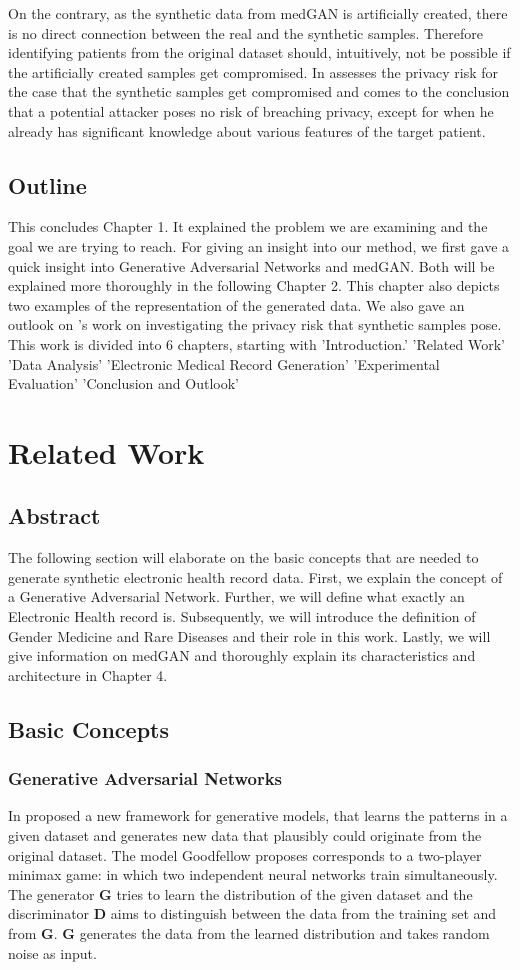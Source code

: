 \documentclass[11pt, a4paper]{book}
\begin{document}
On the contrary, as the synthetic data from medGAN is artificially created, there is no direct connection between the real and the synthetic samples. Therefore identifying patients from the original dataset should, intuitively, not be possible if the artificially created samples get compromised. In \cite{Choi2017} assesses the privacy risk for the case that the synthetic samples get compromised and comes to the conclusion that a potential attacker poses no risk of breaching privacy, except for when he already has significant knowledge about various features of the target patient.
\section{Outline}
This concludes Chapter 1. It explained the problem we are examining and the goal we are trying to reach.
For giving an insight into our method, we first gave a quick insight into Generative Adversarial Networks and medGAN. Both will be explained more thoroughly in the following Chapter 2. This chapter also depicts two examples of the representation of the generated data. We also gave an outlook on \cite{Choi2017}'s work on investigating the privacy risk that synthetic samples pose.
This work is divided into 6 chapters, starting with 'Introduction.'
'Related Work'
'Data Analysis'
'Electronic Medical Record Generation'
'Experimental Evaluation'
'Conclusion and Outlook'
\chapter{Related Work}
\section{Abstract}
The following section will elaborate on the basic concepts that are needed to  generate synthetic electronic health record data.
First, we explain the concept of a Generative Adversarial Network. Further, we will define what exactly an Electronic Health record is. Subsequently, we will introduce the definition of Gender Medicine and Rare Diseases and their role in this work. Lastly, we will give information on medGAN and thoroughly explain its characteristics and architecture in Chapter 4.

\section{Basic Concepts}
\subsection{Generative Adversarial Networks}
In \cite{goodfellow2014generative} proposed a new framework for generative models, that learns the patterns in a given dataset and generates new data that plausibly could originate from the original dataset.
 The model Goodfellow proposes corresponds to a two-player minimax game: in which two independent neural networks train simultaneously. The generator \textbf{G} tries to learn the distribution of the given dataset and the discriminator \textbf{D} aims to distinguish between the data from the training set and from \textbf{G}. \textbf{G} generates the data from the learned distribution and takes random noise as input.
\end{document}
